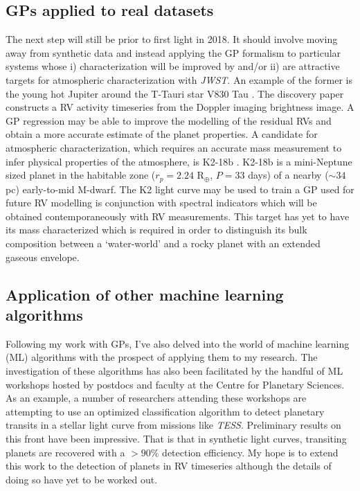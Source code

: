 \subsection{GPs applied to real datasets}
The next step will still be prior to  first light in 2018. 
It should involve moving away from synthetic data and instead applying the GP formalism 
to particular systems whose i) characterization will be improved by \spirou{} and/or 
ii) are 
attractive targets for atmospheric characterization with \emph{JWST}. An example of the 
former is the young hot Jupiter around the T-Tauri star V830 Tau \parencite{donati16}. 
The discovery paper constructs a RV activity timeseries from the Doppler imaging 
brightness image. A GP regression may be able to improve the modelling of the 
residual RVs and obtain a more accurate estimate of the planet properties. 
A candidate for atmospheric characterization, which requires an accurate mass measurement 
to infer physical properties of the atmosphere, is K2-18b \parencite{montet15}. K2-18b is 
a mini-Neptune sized planet in the habitable zone ($r_p = 2.24$ R$_{\oplus}$, $P=33$ days) 
of a nearby ($\sim 34$ pc) early-to-mid M-dwarf. 
The K2 light curve may be used to train a GP used for future RV 
modelling is conjunction with spectral indicators which will be obtained contemporaneously 
with RV measurements. This target has yet to have its mass characterized which is 
required in order to distinguish its bulk composition between a `water-world' and a rocky 
planet with an extended gaseous envelope. \\

\subsection{Application of other machine learning algorithms}
Following my work with GPs, I've also delved into the world of machine learning (ML) algorithms 
with the prospect of applying them to my research. The investigation of these algorithms 
has also been facilitated by the 
handful of ML workshops hosted by postdocs and faculty at the Centre for Planetary Sciences. 
As an example, a number of researchers attending these workshops are attempting to use 
an optimized classification algorithm to detect planetary transits in a stellar light curve 
from missions like \emph{TESS}. Preliminary results on this front have been impressive. 
That is that in synthetic light curves, transiting planets are recovered with a $>90$\% 
detection efficiency. 
My hope is to extend this work to the detection of planets in RV timeseries although the 
details of doing so have yet to be worked out. \\

